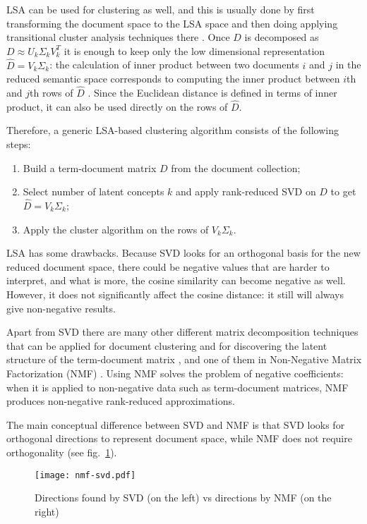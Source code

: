 LSA can be used for clustering as well, and this is usually done
by first transforming the document space to the LSA space
and then doing applying transitional cluster analysis techniques
there \cite{schutze1997projections}.
Once $D$ is decomposed as $D \approx U_k \Sigma_k V_k^T$
it is enough to keep only the low dimensional representation $\hat D = V_k \Sigma_k$:
the calculation of inner product between two documents $i$ and $j$ in
the reduced semantic  space corresponds to computing the inner product
between $i$th and $j$th rows of $\hat D$ \cite{deerwester1990indexing}. Since the
Euclidean distance is defined in terms of inner product, it can also be used
directly on the rows of $\hat D$.

Therefore, a generic LSA-based clustering algorithm consists of the following steps:

\begin{enumerate}
\itemsep1pt\parskip0pt
  \item Build a term-document matrix $D$ from the document collection;
  \item Select number of latent concepts $k$ and apply rank-reduced SVD on $D$
      to get $\hat D= V_k \Sigma_k$;
  \item Apply the cluster algorithm on the rows of $V_k \Sigma_k$.
\end{enumerate}


LSA has some drawbacks. Because SVD looks for an orthogonal basis for the new
reduced document space, there could be negative values that are harder
to interpret, and what is more, the cosine similarity can become negative as well.
However, it does not significantly affect the cosine distance: it still
will always give non-negative results.

Apart from SVD there are many other different matrix decomposition
techniques that can be applied for document clustering and for discovering
the latent structure of the term-document matrix \cite{osinski2006improving},
and one of them in Non-Negative Matrix Factorization (NMF) \cite{lee1999nnmf}.
Using NMF solves the problem of negative coefficients:
when it is applied to non-negative data such as term-document matrices,
NMF produces non-negative rank-reduced approximations.

The main conceptual difference between SVD and NMF is that SVD looks for
orthogonal directions to represent document space, while NMF does not
require orthogonality \cite{xu2003document} (see fig.~\ref{fig:nmf-svd}).


\begin{figure}[h]
\centering\texttt{[image: nmf-svd.pdf]}
\caption{Directions found by  SVD (on the left) vs directions by NMF (on the right)}
\label{fig:nmf-svd}
\end{figure}


